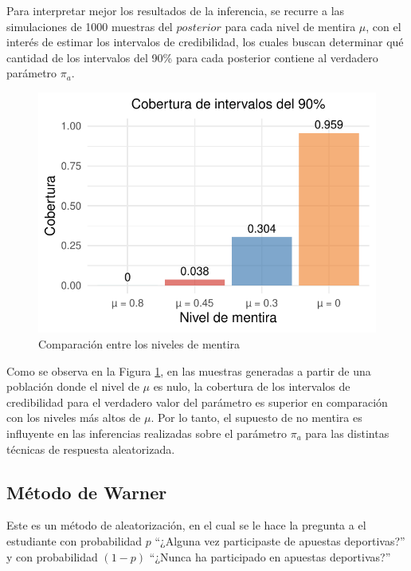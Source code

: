 \documentclass[
]{article}
\begin{document}
Para interpretar mejor los resultados de la inferencia, se recurre a las simulaciones de 1000 muestras del \(posterior\) para cada nivel de mentira \(\mu\), con el interés de estimar los intervalos de credibilidad, los cuales buscan determinar qué cantidad de los intervalos del 90\% para cada posterior contiene al verdadero parámetro \(\pi_a\).

\begin{figure}

{\centering \includegraphics{TP-1--Bayes_files/figure-latex/fig3-1} 

}

\caption{Comparación entre los niveles de mentira}\label{fig:fig3}
\end{figure}

Como se observa en la Figura \ref{fig:fig3}, en las muestras generadas a partir de una población donde el nivel de \(\mu\) es nulo, la cobertura de los intervalos de credibilidad para el verdadero valor del parámetro es superior en comparación con los niveles más altos de \(\mu\). Por lo tanto, el supuesto de no mentira es influyente en las inferencias realizadas sobre el parámetro \(\pi_a\) para las distintas técnicas de respuesta aleatorizada.

\clearpage

\subsection{Método de Warner}\label{Objetivo-2}

Este es un método de aleatorización, en el cual se le hace la pregunta a
el estudiante con probabilidad \(p\) ``¿Alguna vez participaste de apuestas
deportivas?'' y con probabilidad \((1 - p)\) ``¿Nunca ha participado en
apuestas deportivas?''
\end{document}
